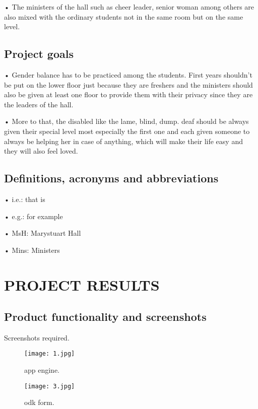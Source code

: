 \documentclass[14pt]{article}
\begin{document}
•	The ministers of the hall such as cheer leader, senior woman among others are also mixed with the ordinary students not in the same room but on the same level.\par

\subsection{Project goals}

•	Gender balance has to be practiced among the students. First years shouldn’t be put on the lower floor just because they are freshers and the ministers should also be given at least one floor to provide them with their privacy since they are the leaders of the hall.\par

•	More to that, the disabled like the lame, blind, dump. deaf should be always given their special level most especially the first one and each given someone to always be helping her in case of anything, which will make their life easy and they will also feel loved.  \par

\subsection{Definitions, acronyms and abbreviations}
•	i.e.: that is\par
•	e.g.: for example\par
•	MsH: Marystuart Hall\par
•	Mins: Ministers\par

\section{PROJECT RESULTS}

\subsection{Product functionality and screenshots}
Screenshots required.

\begin{figure}[h!]
\texttt{[image: 1.jpg]}
\caption{app engine.}
\label{figure1}
\end{figure}

\begin{figure}[h!]
\texttt{[image: 3.jpg]}
\caption{odk form.}
\label{figure2}
\end{figure}
\end{document}
